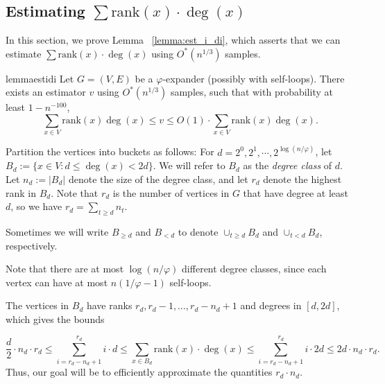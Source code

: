 \documentclass[letterpaper,11pt]{article}
\newcommand{\rank}{\mathrm{rank}}
\theoremstyle{plain}
\theoremstyle{definition}
\theoremstyle{remark}
\begin{document}
\subsection{Estimating $\sum \rank(x)\cdot \deg(x)$}\label{sec:rankdeg}
In this section, we prove Lemma ~\ref{lemma:est_i_di}, which asserts that we can estimate $\sum \rank(x)\cdot \deg(x)$ using $O^*\left(n^{1/3}\right)$ samples. 
\begin{restatable}{lemma}{estidi}
	\label{lemma:est_i_di}
Let $G = (V,E)$ be a $\varphi$-expander (possibly with self-loops).
 There exists an estimator $v$ using $O^*\left(n^{1/3}\right)$  samples, such that with probability at least $1-n^{-100}$, 
 \[ \sum_{x \in V} \rank(x) \deg(x) \leq v \leq O(1)\cdot \sum_{x \in V} \rank(x) \deg(x). \]
\end{restatable}
Partition the vertices into buckets as follows: For $d = 2^0, 2^1, \cdots, 2^{\log(n /\varphi)}$, let $B_d := \{x \in V : d \leq \deg(x) <2d\}.$  We will refer to $B_d$ as the \emph{degree class} of $d$. Let $n_d:=|B_d|$ denote the size of the degree class, and let $r_d$ denote the highest rank in $B_d$. Note that $r_d$ is the number of vertices in $G$ that have degree at least $d$, so we have $r_d= \sum_{t \geq d} n_t$. 

Sometimes we will write $B_{\geq d}$ and $B_{<d}$ to denote $\cup_{t \geq d} B_d$ and $\cup_{t < d} B_d$, respectively.

Note that there are at most $\log(n /\varphi)$ different degree classes, since each vertex can have at most $n(1/\varphi -1)$ self-loops. 

The vertices in $B_d$ have ranks $r_d, r_{d}-1,\dots, r_d -n_d+1$ and degrees in $[d,2d]$, which gives the bounds


\begin{equation}\label{eqn:rdnd}
    \frac{d}{2} \cdot n_d \cdot r_d \leq \sum_{i = r_d -n_d+1}^{r_d} i \cdot d \leq \sum_{x \in B_d} \rank(x) \cdot \deg(x) \leq \sum_{i = r_d -n_d+1}^{r_d} i \cdot 2d \leq 2 d \cdot n_d \cdot r_d.
\end{equation}
Thus, our goal will be to efficiently approximate the quantities $r_d \cdot n_d$.  
\end{document}
